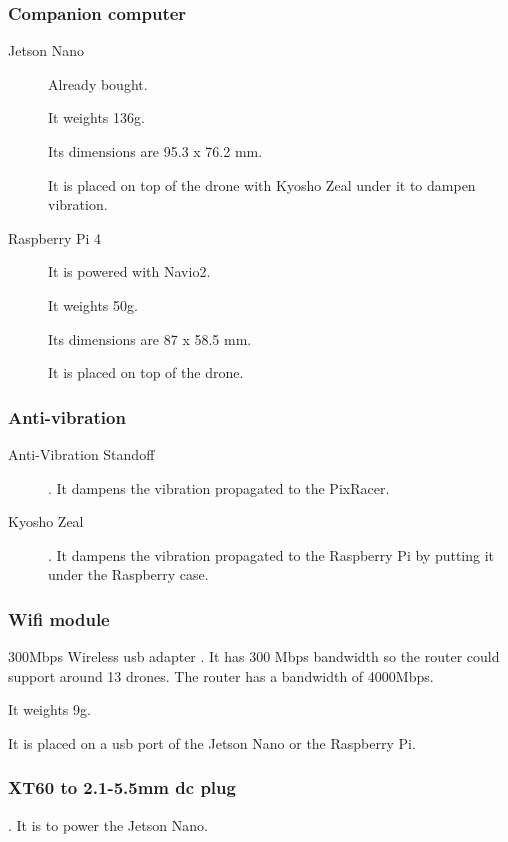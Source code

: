 \subsubsection{Companion computer}

\begin{description}
    \item[Jetson Nano] Already bought.

          It weights 136g.

          Its dimensions are 95.3 x 76.2 mm.

          It is placed on top of the drone with Kyosho Zeal under it to dampen vibration.

    \item[Raspberry Pi 4] It is powered with Navio2.

          It weights 50g.

          Its dimensions are 87 x 58.5 mm.

          It is placed on top of the drone.
\end{description}

\subsubsection{Anti-vibration}
\begin{description}
    \item[Anti-Vibration Standoff] \cite{bangood_standoff}. It dampens the vibration propagated to the PixRacer.
    \item[Kyosho Zeal] \cite{amazon_kyosho}. It dampens the vibration propagated to the Raspberry Pi by putting it under the Raspberry case.
\end{description}

\subsubsection{Wifi module}
300Mbps Wireless usb adapter \cite{amazon_panda_wifi_module}. It has 300 Mbps bandwidth so the router could support around 13 drones. The router has a bandwidth of 4000Mbps.

It weights 9g.

It is placed on a usb port of the Jetson Nano or the Raspberry Pi.

\subsubsection{XT60 to 2.1-5.5mm dc plug}
\cite{bangood_xt60_connector}. It is to power the Jetson Nano.

